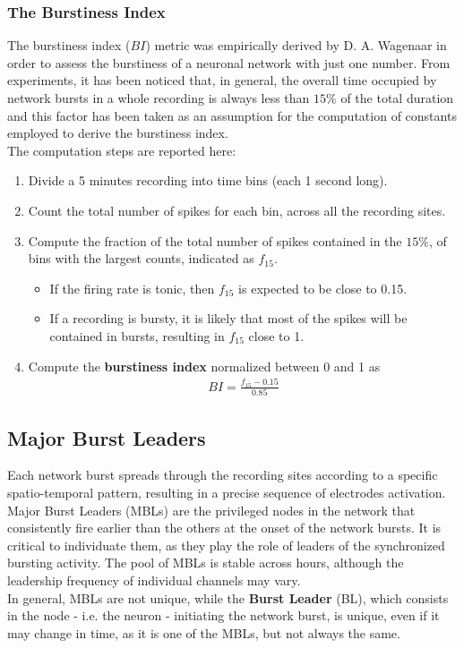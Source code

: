 \subsubsection{The Burstiness Index}
The burstiness index (\(BI\)) metric was empirically derived by D. A. Wagenaar in order to assess the burstiness
of a neuronal network with just one number. From experiments, it has been noticed that,
in general, the overall time occupied by network bursts in a whole recording is
always less than \(15\%\) of the total duration and this factor has been taken as an
assumption for the computation of constants employed to derive the burstiness
index.\\ 
The computation steps are reported here:
\begin{enumerate}
    \item Divide a 5 minutes recording into time bins (each 1 second long).
    \item Count the total number of spikes for each bin, across all the recording sites.
    \item Compute the fraction of the total number of spikes contained in the \(15\%\),
          of bins with the largest counts, indicated as \(f_{15}\).
          \begin{itemize}
              \item If the firing rate is tonic, then \(f_{15}\) is expected to be close to 0.15.
              \item If a recording is bursty, it is likely that most of the spikes will
                    be contained in bursts, resulting in \(f_{15}\) close to 1.
          \end{itemize}
    \item Compute the \textbf{burstiness index} normalized between 0 and 1 as
          \begin{align*}
              BI = \frac{f_{15}-0.15}{0.85}
          \end{align*}
\end{enumerate}
\subsection{Major Burst Leaders}
Each network burst spreads through the recording sites according to a specific
spatio-temporal pattern, resulting in a precise sequence of electrodes activation.
Major Burst Leaders (MBLs) are the privileged nodes in the network that consistently
fire earlier than the others at the onset of the network bursts. It is critical to
individuate them, as they play the role of leaders of the synchronized bursting
activity. The pool of MBLs is stable across hours, although the leadership frequency of individual channels may vary.\\
In general, MBLs are not unique, while the \textbf{Burst Leader} (BL), which consists in the node - i.e. the neuron - initiating the network burst, is unique, even if it may change in time, as it is one of the MBLs, but not always the same.\\


